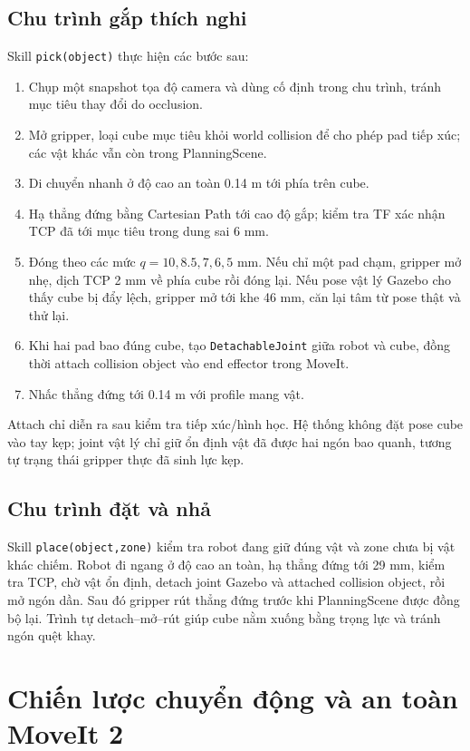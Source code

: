 \documentclass[a4paper,12pt]{article}
\newcommand{\code}[1]{\texttt{#1}}
\newcommand{\skill}[1]{\texttt{#1}}
\begin{document}
\subsection{Chu trình gắp thích nghi}
Skill \skill{pick(object)} thực hiện các bước sau:
\begin{enumerate}
  \item Chụp một snapshot tọa độ camera và dùng cố định trong chu trình, tránh
  mục tiêu thay đổi do occlusion.
  \item Mở gripper, loại cube mục tiêu khỏi world collision để cho phép pad tiếp
  xúc; các vật khác vẫn còn trong PlanningScene.
  \item Di chuyển nhanh ở độ cao an toàn 0.14 m tới phía trên cube.
  \item Hạ thẳng đứng bằng Cartesian Path tới cao độ gắp; kiểm tra TF xác nhận
  TCP đã tới mục tiêu trong dung sai 6 mm.
  \item Đóng theo các mức $q=10,8.5,7,6,5$ mm. Nếu chỉ một pad chạm, gripper mở
  nhẹ, dịch TCP 2 mm về phía cube rồi đóng lại. Nếu pose vật lý Gazebo cho thấy
  cube bị đẩy lệch, gripper mở tới khe 46 mm, căn lại tâm từ pose thật và thử lại.
  \item Khi hai pad bao đúng cube, tạo \code{DetachableJoint} giữa robot và cube,
  đồng thời attach collision object vào end effector trong MoveIt.
  \item Nhấc thẳng đứng tới 0.14 m với profile mang vật.
\end{enumerate}

Attach chỉ diễn ra sau kiểm tra tiếp xúc/hình học. Hệ thống không đặt pose cube
vào tay kẹp; joint vật lý chỉ giữ ổn định vật đã được hai ngón bao quanh, tương
tự trạng thái gripper thực đã sinh lực kẹp.

\subsection{Chu trình đặt và nhả}
Skill \skill{place(object,zone)} kiểm tra robot đang giữ đúng vật và zone chưa
bị vật khác chiếm. Robot đi ngang ở độ cao an toàn, hạ thẳng đứng tới 29 mm,
kiểm tra TCP, chờ vật ổn định, detach joint Gazebo và attached collision object,
rồi mở ngón dần. Sau đó gripper rút thẳng đứng trước khi PlanningScene được đồng
bộ lại. Trình tự detach--mở--rút giúp cube nằm xuống bằng trọng lực và tránh ngón
quệt khay.

\section{Chiến lược chuyển động và an toàn MoveIt 2}
\end{document}
